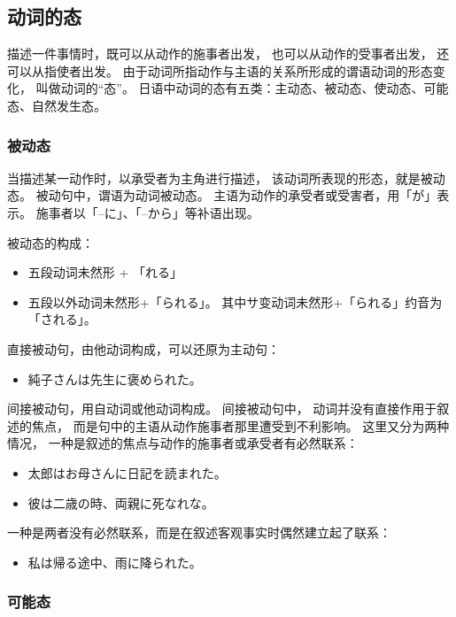 \subsection{动词的态}%

描述一件事情时，既可以从动作的施事者出发，
也可以从动作的受事者出发，
还可以从指使者出发。
由于动词所指动作与主语的关系所形成的谓语动词的形态变化，
叫做动词的``态''。
日语中动词的态有五类：主动态、被动态、使动态、可能态、自然发生态。

\subsubsection{被动态}%

当描述某一动作时，以承受者为主角进行描述，
该动词所表现的形态，就是被动态。
被动句中，谓语为动词被动态。
主语为动作的承受者或受害者，用「が」表示。
施事者以「--に」、「--から」等补语出现。

被动态的构成：
\begin{itemize}
  \item 五段动词未然形 \cn[1] + 「れる」
  \item 五段以外动词未然形+「られる」。
    其中サ变动词未然形+「られる」约音为「される」。
\end{itemize}

直接被动句，由他动词构成，可以还原为主动句：
\begin{itemize}
  \item 純子さんは先生に褒められた。
\end{itemize}

间接被动句，用自动词或他动词构成。
间接被动句中，
动词并没有直接作用于叙述的焦点，
而是句中的主语从动作施事者那里遭受到不利影响。
这里又分为两种情况，
一种是叙述的焦点与动作的施事者或承受者有必然联系：
\begin{itemize}
  \item 太郎はお母さんに日記を読まれた。
  \item 彼は二歳の時、両親に死なれな。
\end{itemize}
一种是两者没有必然联系，而是在叙述客观事实时偶然建立起了联系：
\begin{itemize}
  \item 私は帰る途中、雨に降られた。
\end{itemize}


\subsubsection{可能态}%

